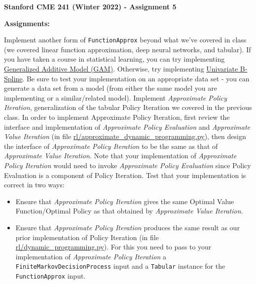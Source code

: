 \documentclass[12pt]{exam}
\begin{document}
\begin{center}
{\large {\bf Stanford CME 241 (Winter 2022) - Assignment 5}}
\end{center}
 
{\large{\bf Assignments:}}
\begin{questions}
	\question Implement another form of \lstinline{FunctionApprox} beyond what we've covered in class (we covered linear function approximation, deep neural networks, and tabular). If you have taken a course in statistical learning, you can try implementing \href{https://en.wikipedia.org/wiki/Generalized_additive_model}{Generalized Additive Model (GAM)}. Otherwise, try implementing \href{https://en.wikipedia.org/wiki/Spline_(mathematics)}{Univariate B-Spline}. Be sure to test your implementation on an appropriate data set - you can generate a data set from a model (from either the same model you are implementing or a similar/related model).
	 Implement {\em Approximate Policy Iteration}, generalization of the tabular Policy Iteration we covered in the previous class. In order to implement Approximate Policy Iteration, first review the interface and implementation of {\em Approximate Policy Evaluation} and {\em Approximate Value Iteration} (in file \href{https://github.com/TikhonJelvis/RL-book/blob/master/rl/approximate_dynamic_programming.py}{rl\//approximate\_dynamic\_programming.py}), then design the interface of {\em Approximate Policy Iteration} to be the same as that of {\em Approximate Value Iteration}. Note that your implementation of {\em Approximate Policy Iteration} would need to invoke {\em Approximate Policy Evaluation} since Policy Evaluation is a component of Policy Iteration. Test that your implementation is correct in two ways:
	\begin{itemize}
	\item Ensure that {\em Approximate Policy Iteration} gives the same Optimal Value Function/Optimal Policy as that obtained by {\em Approximate Value Iteration}.
	\item Ensure that {\em Approximate Policy Iteration} produces the same result as our prior implementation of Policy Iteration (in file \href{https://github.com/TikhonJelvis/RL-book/blob/master/rl/dynamic_programming.py}{rl\//dynamic\_programming.py}). For this you need to pass to your implementation of {\em Approximate Policy Iteration} a \lstinline{FiniteMarkovDecisionProcess} input and a \lstinline{Tabular} instance for the \lstinline{FunctionApprox} input.
	\end{itemize}
\end{questions}
\end{document}
